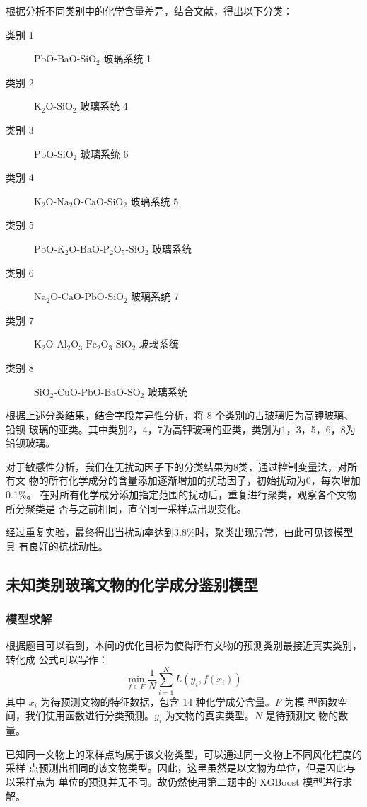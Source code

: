 \documentclass[withoutpreface,bwprint]{cumcmthesis} %
\begin{document}
根据分析不同类别中的化学含量差异，结合文献\cite{ref1,ref2}，得出以下分类：
\begin{description}
    \item[类别 1] $\mathrm{PbO}$-$\mathrm{BaO}$-$\mathrm{SiO_2}$ 玻璃系统 1
    \item[类别 2] $\mathrm{K_2O}\mbox{-}\mathrm{SiO_2}$ 玻璃系统 4
    \item[类别 3] $\mathrm{PbO}\mbox{-}\mathrm{SiO_2}$ 玻璃系统 6
    \item[类别 4] $\mathrm{K_2O}$-$\mathrm{Na_2O}$-$\mathrm{CaO}$-$\mathrm{SiO_2}$ 玻璃系统 5
    \item[类别 5] $\mathrm{PbO\mbox{-}K_2O\mbox{-}BaO\mbox{-}P_2O_5\mbox{-}SiO_2}$ 玻璃系统 
    \item[类别 6] $\mathrm{Na_2O\mbox{-}CaO\mbox{-}PbO\mbox{-}SiO_2}$ 玻璃系统 7 
    \item[类别 7] $\mathrm{K_2O\mbox{-}Al_2O_3\mbox{-}Fe_2O_3\mbox{-}SiO_2}$ 玻璃系统 
    \item[类别 8] $\mathrm{SiO_2\mbox{-}CuO\mbox{-}PbO\mbox{-}BaO\mbox{-}SO_2}$ 玻璃系统 
\end{description}

根据上述分类结果，结合字段差异性分析，将 8 个类别的古玻璃归为高钾玻璃、铅钡
玻璃的亚类。其中类别2，4，7为高钾玻璃的亚类，类别为1，3，5，6，8为铅钡玻璃。

对于敏感性分析，我们在无扰动因子下的分类结果为8类，通过控制变量法，对所有文
物的所有化学成分的含量添加逐渐增加的扰动因子，初始扰动为0，每次增加0.1\%。
在对所有化学成分添加指定范围的扰动后，重复进行聚类，观察各个文物所分聚类是
否与之前相同，直至同一采样点出现变化。

经过重复实验，最终得出当扰动率达到3.8\%时，聚类出现异常，由此可见该模型具
有良好的抗扰动性。

\subsection{未知类别玻璃文物的化学成分鉴别模型}%
\subsubsection{模型求解}
根据题目可以看到，本问的优化目标为使得所有文物的预测类别最接近真实类别，转化成
公式可以写作：
\[
    \min_{f\in F}\frac{1}{N}\sum_{i=1}^NL(y_i,f(x_i))
\]
\indent 其中 $x_i$ 为待预测文物的特征数据，包含 14 种化学成分含量。$F$ 为模
型函数空间，我们使用函数进行分类预测。$y_i$ 为文物的真实类型。$N$ 是待预测文
物的数量。

已知同一文物上的采样点均属于该文物类型，可以通过同一文物上不同风化程度的采样
点预测出相同的该文物类型。因此，这里虽然是以文物为单位，但是因此与以采样点为
单位的预测并无不同。故仍然使用第二题中的 XGBoost 模型进行求解。
\end{document}
